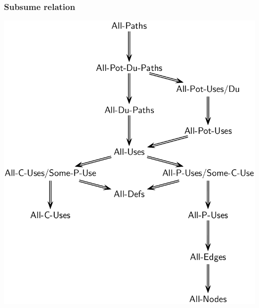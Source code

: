 \begin{frame}[hasprev=false, hasnext=false, c]
\frametitle{Subsume relation}
\label{example:subsume-relation}

\includegraphics[scale=.2]{aux/examples/subsume-relation/subsume-relation}

\end{frame}
